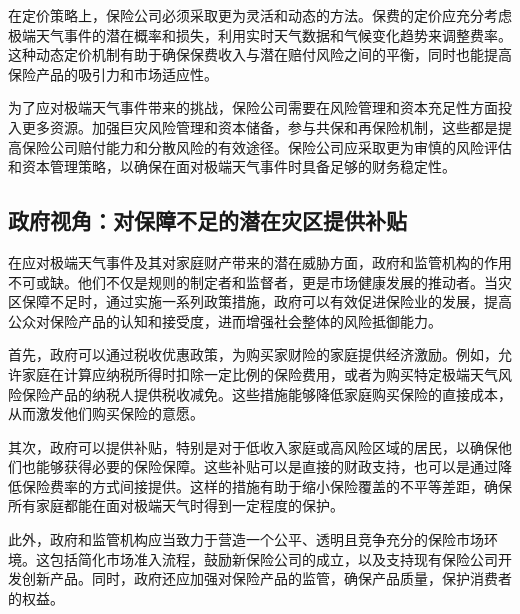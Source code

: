 在定价策略上，保险公司必须采取更为灵活和动态的方法。保费的定价应充分考虑极端天气事件的潜在概率和损失，利用实时天气数据和气候变化趋势来调整费率。这种动态定价机制有助于确保保费收入与潜在赔付风险之间的平衡，同时也能提高保险产品的吸引力和市场适应性。

为了应对极端天气事件带来的挑战，保险公司需要在风险管理和资本充足性方面投入更多资源。加强巨灾风险管理和资本储备，参与共保和再保险机制，这些都是提高保险公司赔付能力和分散风险的有效途径。保险公司应采取更为审慎的风险评估和资本管理策略，以确保在面对极端天气事件时具备足够的财务稳定性。
\subsection{政府视角：对保障不足的潜在灾区提供补贴}

在应对极端天气事件及其对家庭财产带来的潜在威胁方面，政府和监管机构的作用不可或缺。他们不仅是规则的制定者和监督者，更是市场健康发展的推动者。当灾区保障不足时，通过实施一系列政策措施，政府可以有效促进保险业的发展，提高公众对保险产品的认知和接受度，进而增强社会整体的风险抵御能力。

首先，政府可以通过税收优惠政策，为购买家财险的家庭提供经济激励。例如，允许家庭在计算应纳税所得时扣除一定比例的保险费用，或者为购买特定极端天气风险保险产品的纳税人提供税收减免。这些措施能够降低家庭购买保险的直接成本，从而激发他们购买保险的意愿。

其次，政府可以提供补贴，特别是对于低收入家庭或高风险区域的居民，以确保他们也能够获得必要的保险保障。这些补贴可以是直接的财政支持，也可以是通过降低保险费率的方式间接提供。这样的措施有助于缩小保险覆盖的不平等差距，确保所有家庭都能在面对极端天气时得到一定程度的保护。

此外，政府和监管机构应当致力于营造一个公平、透明且竞争充分的保险市场环境。这包括简化市场准入流程，鼓励新保险公司的成立，以及支持现有保险公司开发创新产品。同时，政府还应加强对保险产品的监管，确保产品质量，保护消费者的权益。



